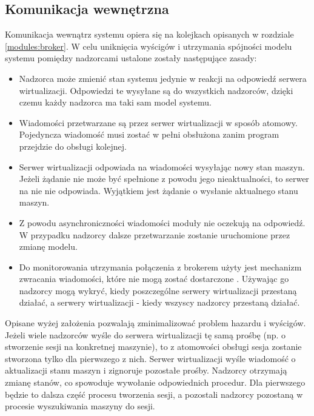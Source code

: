 \documentclass[../opis-rozwiazania.tex]{subfiles}
\begin{document}
\label{communication}

\subsection{Komunikacja wewnętrzna}
\label{communication:broker}

Komunikacja wewnątrz systemu opiera się na kolejkach opisanych w rozdziale \ref{modules:broker}. W celu uniknięcia wyścigów i utrzymania spójności modelu systemu pomiędzy nadzorcami ustalone zostały następujące zasady:
\begin{itemize}
  \item Nadzorca może zmienić stan systemu jedynie w reakcji na odpowiedź serwera wirtualizacji. Odpowiedzi te wysyłane są do wszystkich nadzorców, dzięki czemu każdy nadzorca ma taki sam model systemu.
  \item Wiadomości przetwarzane są przez serwer wirtualizacji w sposób atomowy. Pojedyncza wiadomość musi zostać w pełni obsłużona zanim program przejdzie do obsługi kolejnej.
  \item Serwer wirtualizacji odpowiada na wiadomości wysyłając nowy stan maszyn. Jeżeli żądanie nie może być spełnione z powodu jego nieaktualności, to serwer na nie nie odpowiada. Wyjątkiem jest żądanie o wysłanie aktualnego stanu maszyn.
  \item Z powodu asynchroniczności wiadomości moduły nie oczekują na odpowiedź. W przypadku nadzorcy dalsze przetwarzanie zostanie uruchomione przez zmianę modelu.
  \item Do monitorowania utrzymania połączenia z brokerem użyty jest mechanizm zwracania wiadomości, które nie mogą zostać dostarczone \parencite{rabbit-unroutable}. Używając go nadzorcy mogą wykryć, kiedy poszczególne serwery wirtualizacji przestaną działać, a serwery wirtualizacji - kiedy wszyscy nadzorcy przestaną działać.
\end{itemize}

Opisane wyżej założenia pozwalają zminimalizować problem hazardu i wyścigów. Jeżeli wiele nadzorców wyśle do serwera wirtualizacji tę samą prośbę (np. o stworzenie sesji na konkretnej maszynie), to z atomowości obsługi sesja zostanie stworzona tylko dla pierwszego z nich. Serwer wirtualizacji wyśle wiadomość o aktualizacji stanu maszyn i zignoruje pozostałe prośby. Nadzorcy otrzymają zmianę stanów, co spowoduje wywołanie odpowiednich procedur. Dla pierwszego będzie to dalsza część procesu tworzenia sesji, a pozostali nadzorcy pozostaną w procesie wyszukiwania maszyny do sesji.
\end{document}
